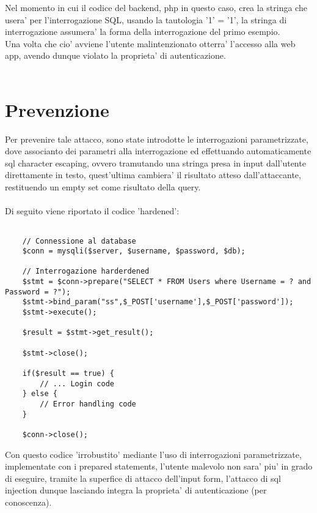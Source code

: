 \documentclass{book}
\begin{document}
Nel momento in cui il codice del backend, php in questo caso, crea la stringa che usera' per l'interrogazione SQL, usando la tautologia '1' = '1',
la stringa di interrogazione assumera' la forma della interrogazione del primo esempio.
\\
Una volta che cio' avviene l'utente malintenzionato otterra' l'accesso alla web app, avendo dunque violato la proprieta' di autenticazione.
\\
\\
\section{Prevenzione}
Per prevenire tale attacco, sono state introdotte le interrogazioni parametrizzate, dove associanto dei parametri alla interrogazione 
ed effettuando automaticamente sql character escaping, ovvero tramutando una stringa presa in input
dall'utente direttamente in testo, quest'ultima cambiera' il risultato atteso dall'attaccante, restituendo un empty set come risultato della query.
\\
\\
Di seguito viene riportato il codice 'hardened':
\\
\begin{lstlisting}
    
    // Connessione al database
    $conn = mysqli($server, $username, $password, $db);

    // Interrogazione harderdened
    $stmt = $conn->prepare("SELECT * FROM Users where Username = ? and Password = ?");
    $stmt->bind_param("ss",$_POST['username'],$_POST['password']);
    $stmt->execute();
    
    $result = $stmt->get_result();

    $stmt->close();

    if($result == true) {
        // ... Login code
    } else {
        // Error handling code
    }

    $conn->close();

\end{lstlisting}
Con questo codice 'irrobustito' mediante l'uso di interrogazioni parametrizzate, implementate con i prepared statements,
l'utente malevolo non sara' piu' in grado di eseguire, tramite la superfice di attacco dell'input form, l'attacco di 
sql injection dunque lasciando integra la proprieta' di autenticazione (per conoscenza).
\end{document}
